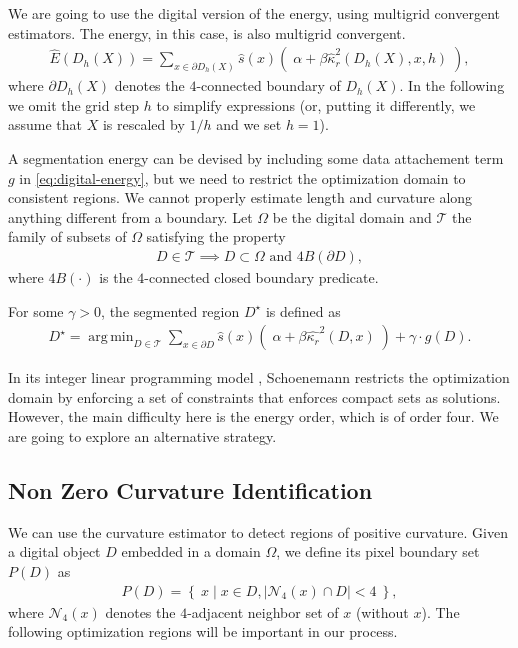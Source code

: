 \documentclass[runningheads]{llncs}
\DeclareMathOperator*{\argmin}{arg\,min}
\begin{document}
We are going to use the digital version of the energy, using multigrid convergent estimators. The energy, in this case, is also multigrid convergent.
\begin{align}
	\hat{E}( D_h(X) ) = \sum_{x \in \partial D_h(X)}{ \hat{s}(x)\left(\; \alpha + \beta \hat{\kappa}_{r}^2(D_h(X),x,h) \; \right)}, 
	\label{eq:digital-energy}
\end{align}
where $\partial D_h(X)$ denotes the $4$-connected boundary of $D_h(X)$. In the following we omit the grid step $h$ to simplify expressions (or, putting it differently, we assume that $X$ is rescaled by $1/h$ and we set $h=1$).

A segmentation energy can be devised by including some data attachement term $g$ in \eqref{eq:digital-energy}, but we need to restrict the optimization domain to consistent regions. We cannot properly estimate length and curvature along anything different from a boundary. Let $\Omega$ be the digital domain and $\mathcal{T}$ the family of subsets of $\Omega$ satisfying the property
\begin{align*}
	D \in \mathcal{T} \implies D \subset \Omega \text{ and } 4B(\partial D),
\end{align*} 
where $4B(\cdot)$ is the $4$-connected closed boundary predicate. 


For some $\gamma>0$, the segmented region $D^\star$ is defined as
\begin{align}
	D^{\star} = \argmin_{D \in \mathcal{T}}{\sum_{x \in \partial D}{ \hat{s}(x)\left(\; \alpha + \beta \hat{\kappa_{r}}^2(D,x) \; \right)} + \gamma \cdot g(D).}
	\label{eq:ideal_optimization_energy}
\end{align}

In its integer linear programming model \cite{schoenemann09}, Schoenemann restricts the optimization domain by enforcing a set of constraints that enforces compact sets as solutions. However, the main difficulty here is the energy order, which is of order four. We are going to explore an alternative strategy.



\subsection{Non Zero Curvature Identification}

We can use the curvature estimator to detect regions of positive curvature. Given a digital object $D$ embedded in a domain $\Omega$, we define its pixel boundary set $P(D)$ as
\begin{align*}
	P(D) = \left\{ \: x \; | \; x \in D, |\mathcal{N}_4(x) \cap D|<4 \: \right\},
\end{align*}
where $\mathcal{N}_4(x)$ denotes the $4$-adjacent neighbor set of $x$ (without $x$). The following optimization regions will be important in our process.
\end{document}
